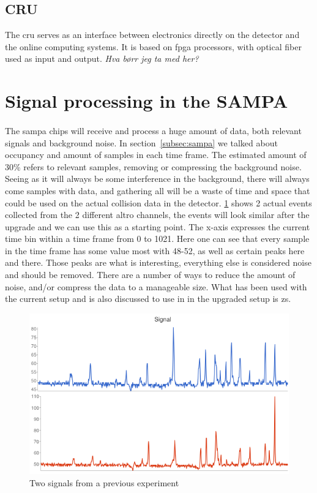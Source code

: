 \documentclass[a4paper, 12pt]{report}
\begin{document}
\subsection{CRU}
The \gls{cru} serves as an interface between electronics directly on the detector and the online computing systems.
It is based on \gls{fpga} processors, with optical fiber used as input and output. %
\textit{Hva børr jeg ta med her?}

\section{Signal processing in the SAMPA}
\paragraph{}
The \gls{sampa} chips will receive and process a huge amount of data, both relevant signals and background noise.
In section~\ref{subsec:sampa} we talked about occupancy and amount of samples in each time frame.
The estimated amount of 30\% refers to relevant samples, removing or compressing the background noise.
Seeing as it will always be some interference in the background, there will always come samples with data, and gathering all will be a waste of time and space that could be used on the actual collision data in the detector.
\ref{fig:signal} shows 2 actual events collected from the 2 different \gls{altro} channels, the events will look similar after the upgrade and we can use this as a starting point.
The x-axis expresses the current time bin within a time frame from 0 to 1021.
Here one can see that every sample in the time frame has some value most with 48-52, as well as certain peaks here and there.
Those peaks are what is interesting, everything else is considered noise and should be removed.
There are a number of ways to reduce the amount of noise, and/or compress the data to a manageable size.
What has been used with the current setup and is also discussed to use in in the upgraded setup is \gls{zs}.

\begin{figure}[h!]
	\centering
		\includegraphics[width=1.0\textwidth]{images/signal.png}
		\caption{Two signals from a previous experiment}
		\label{fig:signal}
\end{figure}
\end{document}
